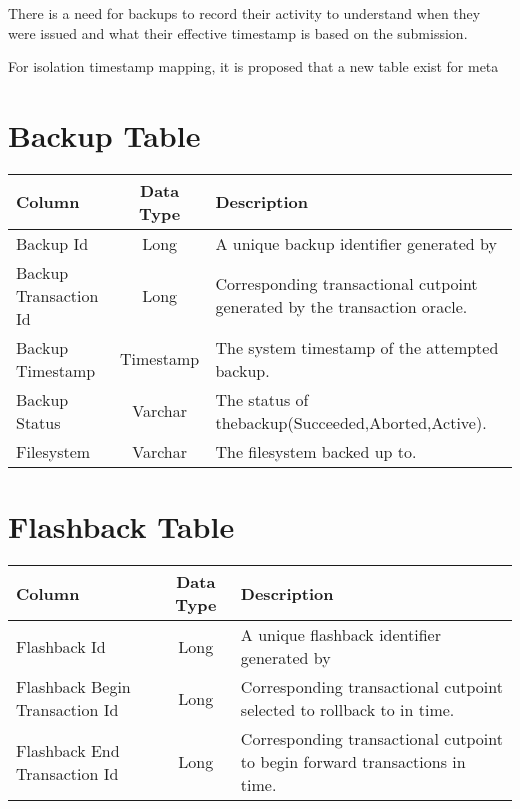 There is a need for backups to record their activity to understand when they
were issued and what their effective timestamp is based on the submission.
 
For isolation timestamp mapping, it is proposed that a new table exist for meta


\section{Backup Table}

\begin{center}
\begin{tabular}{|l|c|p{5cm}|}
				\hline
				\bf{Column}							&	\bf{Data Type}	&	\bf{Description} \\ \hline
				Backup Id							&	Long			&	A unique backup identifier generated by \\ \hline 
				Backup Transaction Id				& 	Long			& 	Corresponding
				transactional cutpoint generated by the transaction oracle. \\ \hline 
				Backup Timestamp				   &	Timestamp		&	The system timestamp of
				the attempted backup.
				\\
				\hline 
				Backup Status						&	Varchar			& 	The status of
				thebackup(Succeeded,Aborted,Active).
				\\
				\hline
				Filesystem						&	Varchar			& 	The filesystem backed up to.
				\\
				\hline

\end{tabular}
\end{center}

\section{Flashback Table}

\begin{center}
\begin{tabular}{|l|c|p{5cm}|}
				\hline
				\bf{Column}							&	\bf{Data Type}	&	\bf{Description} \\ \hline
				Flashback Id							&	Long			&	A unique flashback identifier generated by \\
				\hline 
				Flashback Begin Transaction Id				& 	Long			& 	Corresponding
				transactional cutpoint selected to rollback to in time. \\ \hline 
				Flashback End Transaction Id				& 	Long			& 	Corresponding
				transactional cutpoint to begin forward transactions in time. \\
				\hline 
\end{tabular}
\end{center}


